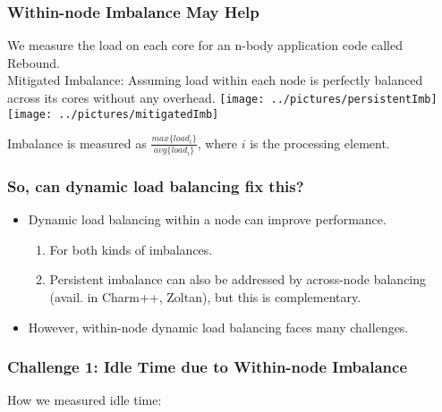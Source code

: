 \begin{frame}[label=ImbWithinNode]
\frametitle{Within-node Imbalance May Help}
{\small We measure the load on each core for an n-body application code called Rebound.}\\
{\small Mitigated Imbalance: Assuming load within each node is perfectly balanced across its cores without any overhead.}
\hspace*{2.5in}\texttt{[image: ../pictures/persistentImb]}\hspace*{1in}\texttt{[image: ../pictures/mitigatedImb]}
\vspace*{-0.1in}
\begin{center}

\end{center}
\begin{center}
{\tiny Imbalance is measured as $\frac{{max\{load_{i}\}}}{avg\{load_{i}\}}$, where $i$ is the processing element.}
\end{center}
\end{frame}

\begin{frame}[label=dynLoadBal]
\frametitle{So, can dynamic load balancing fix this?}
\begin{itemize}
\item Dynamic load balancing within a node can improve performance. 
\begin{enumerate}
\item For both kinds of imbalances. 
\item Persistent imbalance can also be addressed by across-node balancing (avail. in Charm++, Zoltan), but this is complementary.
\end{enumerate}
\vspace*{.5in}
\item However, within-node dynamic load balancing faces many challenges. 
\end{itemize}
\end{frame}

\begin{frame}[label=idleTimeCalc]
\frametitle{Challenge 1: Idle Time due to Within-node Imbalance}
{\tiny How we measured idle time:}
\begin{center}

\end{center}
\end{frame}

